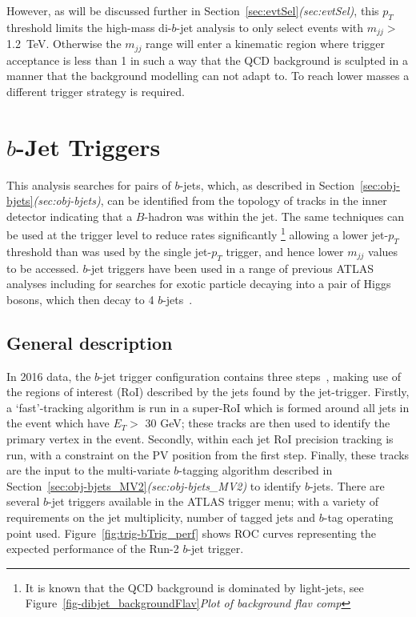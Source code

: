 However, as will be discussed further in Section~\ref{sec:evtSel}\textit{(sec:evtSel)},
this $p_T$ threshold limits the high-mass di-$b$-jet analysis to only select events with $m_{jj} >$ 1.2~TeV.
Otherwise the $m_{jj}$ range will enter a kinematic region where
trigger acceptance is less than 1 in such a way that the QCD background is sculpted
in a manner that the background modelling can not adapt to.
To reach lower masses a different trigger strategy is required.

\section{$b$-Jet Triggers}
\label{sec:trig-bjet}

This analysis searches for pairs of $b$-jets,
which, as described in Section~\ref{sec:obj-bjets}\textit{(sec:obj-bjets)},
can be identified from the topology of tracks in the inner detector indicating that a $B$-hadron was within the jet.
The same techniques can be used at the trigger level to reduce rates significantly
\footnote{It is known that the QCD background is dominated by light-jets, see Figure~\ref{fig-dibjet_backgroundFlav}\textit{Plot of background flav comp}}
allowing a lower jet-$p_T$ threshold than was used by the single jet-$p_T$ trigger, and hence lower $m_{jj}$ values to be accessed.
$b$-jet triggers have been used in a range of previous ATLAS analyses
including for searches for exotic particle decaying into a pair of Higgs bosons, which then decay to 4 $b$-jets~\cite{trig-H4b}.

\subsection{General description}

In 2016 data, the $b$-jet trigger configuration contains three steps~\cite{trig-bTrig_desc},
making use of the regions of interest (RoI) described by the jets found by the jet-trigger.
Firstly, a `fast'-tracking algorithm is run in a super-RoI
which is formed around all jets in the event which have $E_T >$ 30 GeV;
these tracks are then used to identify the primary vertex in the event.
Secondly, within each jet RoI precision tracking is run, with a constraint on the PV position from the first step.
Finally, these tracks are the input to the multi-variate $b$-tagging algorithm described in
Section~\ref{sec:obj-bjets_MV2}\textit{(sec:obj-bjets\_MV2)} to identify $b$-jets.
There are several $b$-jet triggers available in the ATLAS trigger menu;
with a variety of requirements on the jet multiplicity, number of tagged jets and $b$-tag operating point used.
Figure~\ref{fig:trig-bTrig_perf} shows ROC curves representing the expected performance of the Run-2 $b$-jet trigger.


